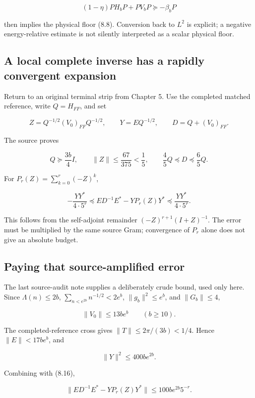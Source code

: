 \documentclass[
  10pt,
  a4paper,
  10pt,
  oneside,
  openany]{book}
\begin{document}
\[
(1-\eta)PH_bP+PV_bP\succeq-\beta_bP
\tag{8.13}\label{eq:8.13}
\]

then implies the physical floor (8.8). Conversion back to \(L^2\) is
explicit; a negative energy-relative estimate is not silently
interpreted as a scalar physical floor.

\subsection{A local complete inverse has a rapidly convergent
expansion}\label{a-local-complete-inverse-has-a-rapidly-convergent-expansion}

Return to an original terminal strip from Chapter 5. Use the completed
matched reference, write \(Q=H_{FF}\), and set

\[
Z=Q^{-1/2}(V_0)_{FF}Q^{-1/2},
\qquad Y=EQ^{-1/2},
\qquad D=Q+(V_0)_{FF}.
\tag{8.14}\label{eq:8.14}
\]

The source proves

\[
Q\succeq\frac{3b}{4}I,
\qquad\|Z\|\le\frac{67}{375}<\frac15,
\qquad\frac45Q\preceq D\preceq\frac65Q.
\tag{8.15}\label{eq:8.15}
\]

For \(P_r(Z)=\sum_{k=0}^r(-Z)^k\),

\[
-\frac{YY^*}{4\cdot5^r}
\preceq ED^{-1}E^*-YP_r(Z)Y^*
\preceq\frac{YY^*}{4\cdot5^r}.
\tag{8.16}\label{eq:8.16}
\]

This follows from the self-adjoint remainder \((-Z)^{r+1}(I+Z)^{-1}\).
The error must be multiplied by the same source Gram; convergence of
\(P_r\) alone does not give an absolute budget.

\subsection{Paying that source-amplified
error}\label{paying-that-source-amplified-error}

The last source-audit note supplies a deliberately crude bound, used
only here. Since \(\Lambda(n)\le2b\), \(\sum_{n<e^{2b}}n^{-1/2}<2e^b\),
\(\|g_b\|^2\le e^b\), and \(\|G_b\|\le4\),

\[
\|V_0\|\le13be^b\qquad(b\ge10).
\tag{8.17}\label{eq:8.17}
\]

The completed-reference cross gives \(\|T\|\le2\pi/(3b)<1/4\). Hence
\(\|E\|<17be^b\), and

\[
\|Y\|^2\le400be^{2b}.
\tag{8.18}\label{eq:8.18}
\]

Combining with (8.16),

\[
\|ED^{-1}E^*-YP_r(Z)Y^*\|
\le100be^{2b}5^{-r}.
\tag{8.19}\label{eq:8.19}
\]
\end{document}
